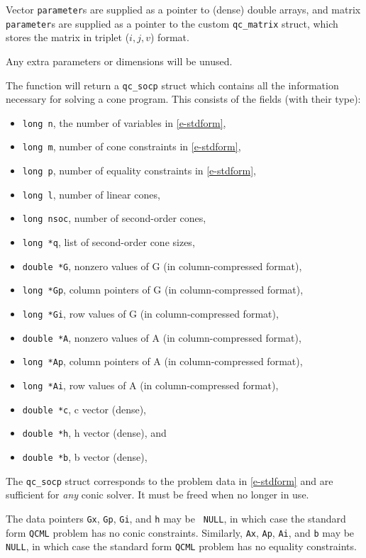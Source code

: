 \documentclass[11pt]{article}
\def\qcml{\texttt{QCML}\xspace}
\begin{document}
Vector {\tt parameter}s
are supplied as a pointer to (dense) double arrays, and matrix {\tt
parameter}s are supplied as a pointer to the custom {\tt qc\_matrix} struct,
which stores the matrix in triplet ($i,j,v$) format.

Any extra parameters or dimensions will be unused.

The function will return a {\tt qc\_socp} struct which contains all the
information necessary for solving a cone program. This consists of the
fields (with their type):
\begin{itemize}
  \item {\tt long n}, the number of variables in \eqref{e-stdform},
  \item {\tt long m}, number of cone constraints in \eqref{e-stdform},
  \item {\tt long p}, number of equality constraints in \eqref{e-stdform},
  \item {\tt long l}, number of linear cones,
  \item {\tt long nsoc}, number of second-order cones,
  \item {\tt long *q}, list of second-order cone sizes,
  \item {\tt double *G}, nonzero values of G (in column-compressed format),
  \item {\tt long *Gp}, column pointers of G (in column-compressed format),
  \item {\tt long *Gi}, row values of G (in column-compressed format),
  \item {\tt double *A}, nonzero values of A (in column-compressed format),
  \item {\tt long *Ap}, column pointers of A (in column-compressed format),
  \item {\tt long *Ai}, row values of A (in column-compressed format),
  \item {\tt double *c}, c vector (dense),
  \item {\tt double *h}, h vector (dense), and
  \item {\tt double *b}, b vector (dense),
\end{itemize}
The {\tt qc\_socp} struct corresponds to the problem data in \eqref{e-stdform}
and are sufficient for \emph{any} conic solver. It must be freed when no
longer in use.

The data pointers {\tt Gx}, {\tt Gp}, {\tt Gi}, and {\tt h} may be {\tt
NULL}, in which case the standard form \qcml problem has no conic
constraints. Similarly, {\tt Ax}, {\tt Ap}, {\tt Ai}, and {\tt b} may be {\tt
NULL}, in which case the standard form \qcml problem has no equality
constraints.
\end{document}
